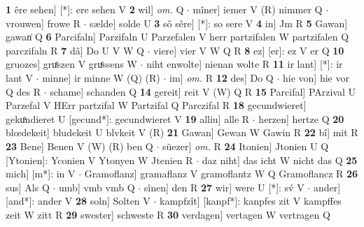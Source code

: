 \documentclass[8pt,a4paper,notitlepage]{article}
\begin{document}
\begin{table}[ht]
\begin{minipage}[t]{0.5\linewidth}
\textbf{1} êre sehen] [*]: ere sehen V \textbf{2} wil] \textit{om.} Q  $\cdot$ mîner] iemer V (R) nimmer Q  $\cdot$ vrouwen] frowe R  $\cdot$ sælde] solde U \textbf{3} sô sêre] [*]: so sere V \textbf{4} in] Jm R \textbf{5} Gawan] gawan͑ Q \textbf{6} Parcifaln] Parzifaln U Parzefalen V herr partzifalen W partzifalen Q parczifaln R \textbf{7} dâ] Do U V W Q  $\cdot$ viere] vier V W Q R \textbf{8} ez] [er]: ez V er Q \textbf{10} gruozes] gruͤszen V gruͤssens W  $\cdot$ niht enwolte] nienan wolte R \textbf{11} ir lant] [*]: ir lant V  $\cdot$ minne] ir minne W (Q) (R)  $\cdot$ im] \textit{om.} R \textbf{12} des] Do Q  $\cdot$ hie von] hie vor Q des R  $\cdot$ schame] schanden Q \textbf{14} gereit] reit V (W) Q R \textbf{15} Parcifal] PArzival U Parzefal V HErr partzifal W Partzifal Q Parczifal R \textbf{18} gecundwieret] gekuͦndieret U [gecund*]: gecundwieret V \textbf{19} alliu] alle R  $\cdot$ herzen] hertze Q \textbf{20} blœdekeit] bludekeit U blvkeit V (R) \textbf{21} Gawan] Gewan W Gawin R \textbf{22} bî] mit R \textbf{23} Bene] Benen V (W) (R) ben Q  $\cdot$ süezer] \textit{om.} R \textbf{24} Itonien] Jtonien U Q [Ytonien]: Yconien V Ytonyen W Jtenien R  $\cdot$ daz niht] das icht W nicht das Q \textbf{25} mich] [m*]: in V  $\cdot$ Gramoflanz] gramaflanz V gramoflantz W Q Gramoflancz R \textbf{26} sus] Als Q  $\cdot$ umb] vmb vmb Q  $\cdot$ sînen] den R \textbf{27} wir] were U [*]: sv́ V  $\cdot$ ander] [and*]: ander V \textbf{28} soln] Solten V  $\cdot$ kampfzît] [kanpf*]: kanpfes zit V kampffes zeit W zitt R \textbf{29} swester] schweste R \textbf{30} verdagen] vertagen W vertragen Q \newline
\end{minipage}
\end{table}
\end{document}
